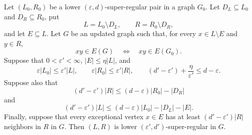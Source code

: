 \begin{lemma}
Let $(L_0,R_0)$ be a lower $(\varepsilon,d)$-super-regular pair in a graph $G_0$.  Let $D_L\subseteq L_0$ and $D_R\subseteq R_0$, put
\[
 L=L_0\setminus D_L,\qquad R=R_0\setminus D_R,
\]
and let $E\subseteq L$.  Let $G$ be an updated graph such that, for every $x\in L\setminus E$ and $y\in R$,
\[
 xy\in E(G)\quad\Longleftrightarrow\quad xy\in E(G_0).
\]
Suppose that $0<\varepsilon'<\infty$, $|E|\leq\eta|L|$, and
\[
 \varepsilon|L_0|\leq\varepsilon'|L|,
 \qquad
 \varepsilon|R_0|\leq\varepsilon'|R|,
 \qquad
 (d'-\varepsilon')+\frac{\eta}{\varepsilon'}\leq d-\varepsilon.
\]
Suppose also that
\[
 (d'-\varepsilon')|R|\leq (d-\varepsilon)|R_0|-|D_R|
\]
and
\[
 (d'-\varepsilon')|L|\leq (d-\varepsilon)|L_0|-|D_L|-|E|.
\]
Finally, suppose that every exceptional vertex $x\in E$ has at least
$(d'-\varepsilon')|R|$ neighbors in $R$ in $G$.  Then $(L,R)$ is lower
$(\varepsilon',d')$-super-regular in $G$.
\end{lemma}
